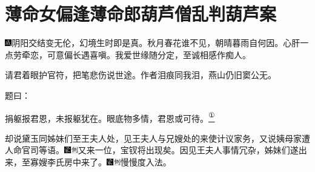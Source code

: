 
\chapter{薄命女偏逢薄命郎\hspace{.5em}葫芦僧乱判葫芦案}

{\includegraphics[width=3mm]{../Images/00005}\kaishu 阴阳交结变无伦，幻境生时即是真。秋月春花谁不见，朝晴暮雨自何因。心肝一点劳牵恋，可意偏长遇喜嗔。我爱世缘随分定，至诚相感作痴人。}

{\kaishu 请君着眼护官符，把笔悲伤说世途。作者泪痕同我泪，燕山仍旧窦公无。}

题曰：

捐躯报君恩，未报躯犹在。眼底物多情，君恩或可待。\href{../Text/part0008_split_000.html\#lnkback_1_a}{\textsuperscript{①}}

却说黛玉同姊妹们至王夫人处，见王夫人与兄嫂处的来使计议家务，又说姨母家遭人命官司等语。{\includegraphics[width=3mm]{../Images/00006}\includegraphics[width=3mm]{../Images/00011}\footnotesize \kaishu 又来一位，宝钗将出现矣。}因见王夫人事情冗杂，姊妹们遂出来，至寡嫂李氏房中来了。{\includegraphics[width=3mm]{../Images/00006}\includegraphics[width=3mm]{../Images/00011}\footnotesize \kaishu 慢慢度入法。}

